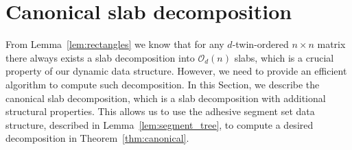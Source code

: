 \documentclass[runningheads]{llncs}
\newcommand{\wn}[2][inline]{\todo[color=green!50,#1]{{\textbf{W:} #2}}}
\newcommand{\jc}[2][inline]{\todo[color=brown!50,#1]{{\textbf{J:} #2}}}
\newcommand{\Oh}{\mathcal{O}}
\begin{document}

 
\section{Canonical slab decomposition}
\label{sec:decomposition}


From Lemma~\ref{lem:rectangles} we know that for any $d$-twin-ordered $n \times n$ matrix there always exists a slab decomposition into $\Oh_d(n)$ slabs, which is a crucial property of our dynamic data structure. However, we need to provide an efficient algorithm to compute such decomposition. 
In this Section, we describe the canonical slab decomposition, which is a slab decomposition with additional structural properties. This allows us to use the adhesive segment set data structure, described in Lemma~\ref{lem:segment_tree}, to compute a desired decomposition in Theorem~\ref{thm:canonical}.
\end{document}
